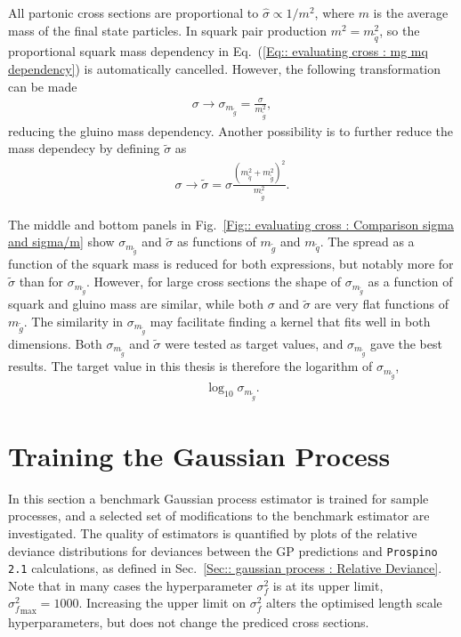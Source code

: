 \documentclass[twoside,english]{uiofysmaster}
\begin{document}
{{All partonic cross sections are proportional to $\hat{\sigma} \propto 1/m^2$, where $m$ is the average mass of the final state particles. In squark pair production $m^2 = m_{\widetilde{q}}^2$, so the proportional squark mass dependency in Eq.~(\ref{Eq:: evaluating cross : mg mq dependency}) is automatically cancelled. However, the following transformation can be made
\begin{align}
\sigma \rightarrow \sigma_{m_{\widetilde{g}}} = \frac{\sigma}{m_{\widetilde{g}}^2},
\end{align}
reducing the gluino mass dependency. Another possibility is to further reduce the mass dependecy by defining $\tilde{\sigma}$ as 
\begin{align}
\sigma \rightarrow \tilde{\sigma} = \sigma \frac{(m_{\widetilde{q}}^2 + m_{\widetilde{g}}^2)^2}{m_{\widetilde{g}}^2}.
\end{align}


The middle and bottom panels in Fig.~\ref{Fig:: evaluating cross : Comparison sigma and sigma/m} show $\sigma_{m_{\widetilde{g}}}$ and $\tilde{\sigma}$ as functions of $m_{\widetilde{g}}$ and $m_{\widetilde{q}}$. The spread as a function of the squark mass is reduced for both expressions, but notably more for $\tilde{\sigma}$ than for $\sigma_{m_{\widetilde{g}}}$. However, for large cross sections the shape of $\sigma_{m_{\widetilde{g}}}$ as a function of squark and gluino mass are similar, while both $\sigma$ and $\tilde{\sigma}$ are very flat functions of $m_{\widetilde{g}}$. The similarity in $\sigma_{m_{\widetilde{g}}}$ may facilitate finding a kernel that fits well in both dimensions. Both $\sigma_{m_{\widetilde{g}}}$ and $\tilde{\sigma}$ were tested as target values, and $\sigma_{m_{\widetilde{g}}}$ gave the best results. The target value in this thesis is therefore the logarithm of $\sigma_{m_{\widetilde{g}}}$,
\begin{align}
\log_{10} \sigma_{m_{\widetilde{g}}}.
\end{align}





\section{Training the Gaussian Process}

In this section a benchmark Gaussian process estimator is trained for sample processes, and a selected set of modifications to the benchmark estimator are investigated. The quality of estimators is quantified by plots of the relative deviance distributions for deviances between the GP predictions and \verb|Prospino 2.1| calculations, as defined in Sec.~\ref{Sec:: gaussian process : Relative Deviance}. Note that in many cases the hyperparameter $\sigma_f^2$ is at its upper limit, ${\sigma_f^2}_{\mathrm{max}} = 1000$. Increasing the upper limit on $\sigma_f^2$ alters the optimised length scale hyperparameters, but does not change the prediced cross sections. 

}}
\end{document}
